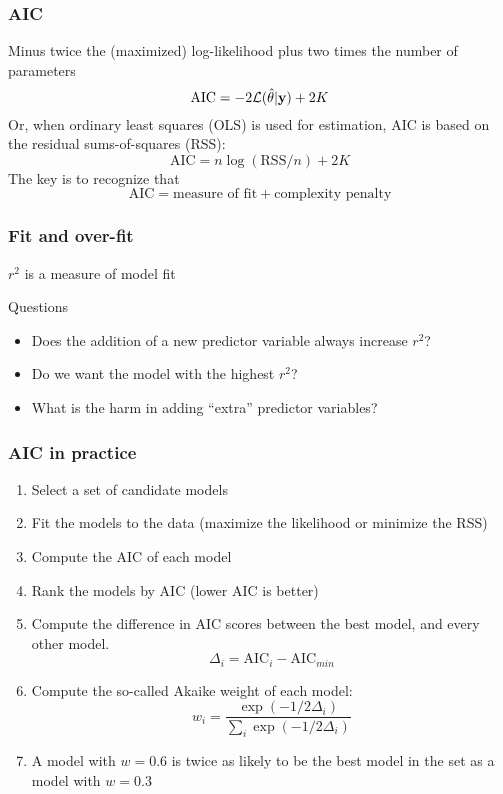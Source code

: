 \documentclass[color=usenames,dvipsnames]{beamer}\usepackage[]{graphicx}\usepackage[]{color}
\begin{document}
\begin{frame}[fragile]
  \frametitle{AIC}
  \large
  Minus twice the (maximized) log-likelihood plus two times the number of
  parameters
\[
 \mathrm{AIC} = -2\mathcal{L}(\hat{\theta} | {\bf y}) + 2K
\]
  \pause
  Or, when ordinary least squares (OLS) is used for estimation, AIC is
  based on the residual sums-of-squares (RSS):
\[
 \mathrm{AIC} = n\log(\mathrm{RSS}/n) + 2K
\]
 \pause
 The key is to recognize that
\[
 \mathrm{AIC} = \text{measure of fit} + \text{complexity penalty}
\]
\end{frame}



\begin{frame}
  \frametitle{Fit and over-fit}
  \large
  {$r^2$ is a measure of model fit \par}
  \vspace{1cm}
  \pause
  {Questions}
  \begin{itemize}[<+->]
    \item Does the addition of a new predictor variable always
      increase $r^2$?
    \item Do we want the model with the highest $r^2$?
    \item What is the harm in adding ``extra'' predictor variables?
  \end{itemize}
\end{frame}


\begin{frame}
  \frametitle{AIC in practice}
  \large
\begin{enumerate}[<+- | visible@+->][\bf \color{PineGreen} (1)]
  \item Select a set of candidate models
  \item Fit the models to the data (maximize the likelihood or
    minimize the RSS)
  \item Compute the AIC of each model
  \item Rank the models by AIC (lower AIC is better)
  \item Compute the difference in AIC scores between the
    best model, and every other model.
    \[
    \Delta_i = \text{AIC}_i - \text{AIC}_{min}
    \]
  \item Compute the so-called Akaike weight of each model:
    \[
    w_i = \frac{\exp(-1/2\Delta_i)}{\sum_i \exp(-1/2\Delta_i)}
    \]
  \item A model with $w=0.6$ is twice as likely to be the best model
    in the set as a model with $w=0.3$
\end{enumerate}
\end{frame}
\end{document}
